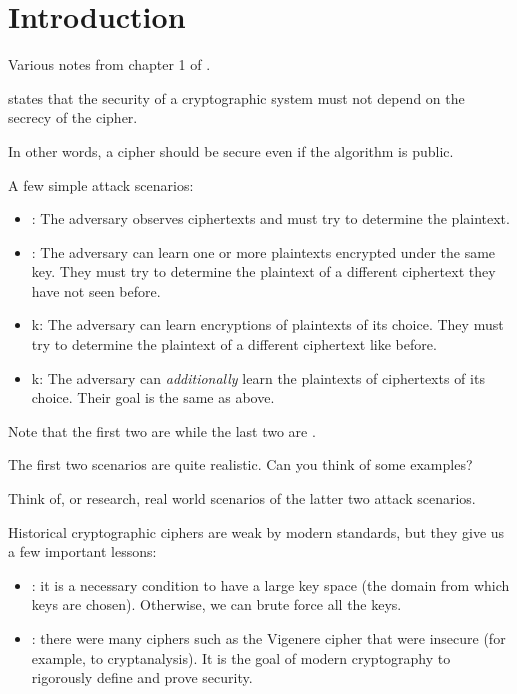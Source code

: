 \section{Introduction}
\label{introduction}

Various notes from chapter 1 of \cite{katz-lindell}.

\begin{definition}
     states that the security of a cryptographic system  must not depend on the secrecy of the cipher.

    In other words, a cipher should be secure even if the algorithm is public.
\end{definition}

A few simple attack scenarios:
\begin{itemize}
    \item {}: The adversary observes ciphertexts and must try to determine the plaintext.
\item {}: The adversary can learn one or more plaintexts encrypted under the same key. They must try to determine the plaintext of a different ciphertext they have not seen before.
\item {}k: The adversary can learn encryptions of plaintexts of its choice. They must try to determine the plaintext of a different ciphertext like before.
\item {}k: The adversary can \textit{additionally} learn the plaintexts of ciphertexts of its choice. Their goal is the same as above.
\end{itemize}

Note that the first two are  while the last two are .

\begin{exercise}
    The first two scenarios are quite realistic. Can you think of some examples?
\end{exercise} 

\begin{exercise}
    Think of, or research, real world scenarios of the latter two attack scenarios.
\end{exercise}

Historical cryptographic ciphers are weak by modern standards, but they give us a few important lessons:
\begin{itemize}
    \item {}: it is a necessary condition to have a large key space (the domain from which keys are chosen). Otherwise, we can brute force all the keys.
    \item {}: there were many ciphers such as the Vigenere cipher that were insecure (for example, to cryptanalysis). It is the goal of modern cryptography to rigorously define and prove security.
\end{itemize}

